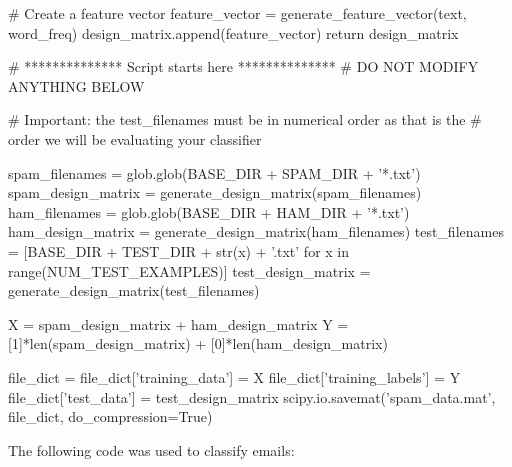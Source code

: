 \documentclass{article}
\begin{document}
\begin{python}
            # Create a feature vector
            feature_vector = generate_feature_vector(text, word_freq)
            design_matrix.append(feature_vector)
    return design_matrix

# ************** Script starts here **************
# DO NOT MODIFY ANYTHING BELOW

# Important: the test_filenames must be in numerical order as that is the
# order we will be evaluating your classifier

spam_filenames = glob.glob(BASE_DIR + SPAM_DIR + '*.txt')
spam_design_matrix = generate_design_matrix(spam_filenames)
ham_filenames = glob.glob(BASE_DIR + HAM_DIR + '*.txt')
ham_design_matrix = generate_design_matrix(ham_filenames)
test_filenames = [BASE_DIR + TEST_DIR + str(x) + '.txt' for x in range(NUM_TEST_EXAMPLES)]
test_design_matrix = generate_design_matrix(test_filenames)

X = spam_design_matrix + ham_design_matrix
Y = [1]*len(spam_design_matrix) + [0]*len(ham_design_matrix)

file_dict = {}
file_dict['training_data'] = X
file_dict['training_labels'] = Y
file_dict['test_data'] = test_design_matrix
scipy.io.savemat('spam_data.mat', file_dict, do_compression=True)
\end{python}
\newpage
The following code was used to classify emails:
\end{document}
